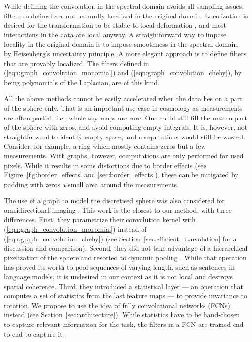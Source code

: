\documentclass[final,twocolumn,3p,times,sort&compress]{elsarticle}
\newcommand{\todo}[1]{{\color[rgb]{.6,.1,.6}{#1}}}
\newcommand{\figref}[1]{Figure~\ref{fig:#1}}
\newcommand{\secref}[1]{Section~\ref{sec:#1}}
\newcommand{\eqnref}[1]{(\ref{eqn:#1})}
\newcommand{\1}{\b{1}}              %
\newcommand{\0}{\b{0}}              %
\begin{document}
While defining the convolution in the spectral domain avoids all sampling issues, filters so defined are not naturally localized in the original domain.
Localization is desired for the transformation to be stable to local deformation \citep{mallat2012scattering}, and most interactions in the data are local anyway.
A straightforward way to impose locality in the original domain is to impose smoothness in the spectral domain, by Heisenberg's uncertainty principle.
A more elegant approach is to define filters that are provably localized.
The filters defined in \eqnref{graph_convolution_monomial} and \eqnref{graph_convolution_cheby}, by being polynomials of the Laplacian, are of this kind.

All the above methods cannot be easily accelerated when the data lies on a part of the sphere only.
That is an important use case in cosmology as measurements are often partial, i.e., whole sky maps are rare.
One could still fill the unseen part of the sphere with zeros, and avoid computing empty integrals.
It is, however, not straightforward to identify empty space, and computations would still be wasted.
Consider, for example, a ring which mostly contains zeros but a few measurements.
With graphs, however, computations are only performed for used pixels.
While it results in some distortions due to border effects (see \figref{border_effects} and \ref{sec:border_effects}), these can be mitigated by padding with zeros a small area around the measurements.

The use of a graph to model the discretised sphere was also considered for omnidirectional imaging \citep{khasanova2017graphomni}.
This work is the closest to our method, with three differences. First, they parametrize their convolution kernel with \eqnref{graph_convolution_monomial} instead of \eqnref{graph_convolution_cheby} (see \secref{efficient_convolution} for a discussion and comparison).
Second, they did not take advantage of a hierarchical pixelization of the sphere and resorted to dynamic pooling \citep{kalchbrenner2014dcnn}.
While that operation has proved its worth to pool sequences of varying length, such as sentences in language models, it is undesired in our context as it is not local and destroys spatial coherence.
Third, they introduced a statistical layer --- an operation that computes a set of statistics from the last feature maps --- to provide invariance to rotation.
We propose to use the idea of fully convolutional networks (FCNs) instead (see \secref{architecture}).
While statistics have to be hand-chosen to capture relevant information for the task, the filters in a FCN are trained end-to-end to capture it.
\end{document}
